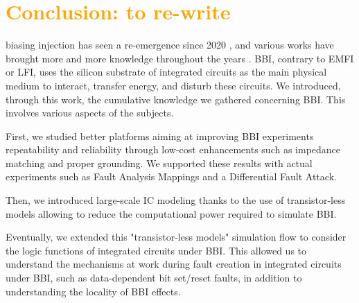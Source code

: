 
\section{\textcolor{orange}{Conclusion: to re-write}}
	 biasing injection has seen a re-emergence since 2020 \cite{bbiColin}, and various works have brought more and more knowledge throughout the years \cite{bbiOrigin, bbiSecond, bbiThird, bbiColin,japbbi, japbbi2, mybbiCosade, mybbiFdtc2022, mybbifdtc2023, colinFdtc2023}.
	BBI, contrary to EMFI or LFI, uses the silicon substrate of integrated circuits as the main physical medium to interact, transfer energy, and disturb these circuits.
	We introduced, through this work, the cumulative knowledge we gathered concerning BBI.
	This involves various aspects of the subjects.

	First, we studied better platforms aiming at improving BBI experiments repeatability and reliability through low-cost enhancements such as impedance matching and proper grounding.
	We supported these results with actual experiments such as Fault Analysis Mappings and a Differential Fault Attack.

	Then, we introduced large-scale IC modeling thanks to the use of transistor-less models allowing to reduce the computational power required to simulate BBI.

	Eventually, we extended this "transistor-less models" simulation flow to consider the logic functions of integrated circuits under BBI.
	This allowed us to understand the mechanisms at work during fault creation in integrated circuits under BBI, such as data-dependent bit set/reset faults, in addition to understanding the locality of BBI effects.